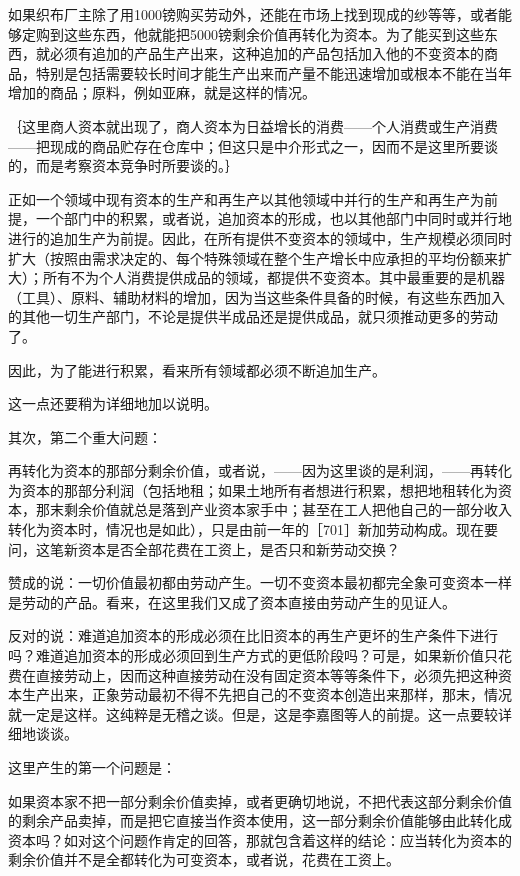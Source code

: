 如果织布厂主除了用1000镑购买劳动外，还能在市场上找到现成的纱等等，或者能够定购到这些东西，他就能把5000镑剩余价值再转化为资本。为了能买到这些东西，就必须有追加的产品生产出来，这种追加的产品包括加入他的不变资本的商品，特别是包括需要较长时间才能生产出来而产量不能迅速增加或根本不能在当年增加的商品；原料，例如亚麻，就是这样的情况。

｛这里商人资本就出现了，商人资本为日益增长的消费——个人消费或生产消费——把现成的商品贮存在仓库中；但这只是中介形式之一，因而不是这里所要谈的，而是考察资本竞争时所要谈的。｝

正如一个领域中现有资本的生产和再生产以其他领域中并行的生产和再生产为前提，一个部门中的积累，或者说，追加资本的形成，也以其他部门中同时或并行地进行的追加生产为前提。因此，在所有提供不变资本的领域中，生产规模必须同时扩大（按照由需求决定的、每个特殊领域在整个生产增长中应承担的平均份额来扩大）；所有不为个人消费提供成品的领域，都提供不变资本。其中最重要的是机器（工具）、原料、辅助材料的增加，因为当这些条件具备的时候，有这些东西加入的其他一切生产部门，不论是提供半成品还是提供成品，就只须推动更多的劳动了。

因此，为了能进行积累，看来所有领域都必须不断追加生产。

这一点还要稍为详细地加以说明。

其次，第二个重大问题：

再转化为资本的那部分剩余价值，或者说，——因为这里谈的是利润，——再转化为资本的那部分利润（包括地租；如果土地所有者想进行积累，想把地租转化为资本，那末剩余价值就总是落到产业资本家手中；甚至在工人把他自己的一部分收入转化为资本时，情况也是如此），只是由前一年的［701］新加劳动构成。现在要问，这笔新资本是否全部花费在工资上，是否只和新劳动交换？

赞成的说：一切价值最初都由劳动产生。一切不变资本最初都完全象可变资本一样是劳动的产品。看来，在这里我们又成了资本直接由劳动产生的见证人。

反对的说：难道追加资本的形成必须在比旧资本的再生产更坏的生产条件下进行吗？难道追加资本的形成必须回到生产方式的更低阶段吗？可是，如果新价值只花费在直接劳动上，因而这种直接劳动在没有固定资本等等条件下，必须先把这种资本生产出来，正象劳动最初不得不先把自己的不变资本创造出来那样，那末，情况就一定是这样。这纯粹是无稽之谈。但是，这是李嘉图等人的前提。这一点要较详细地谈谈。

这里产生的第一个问题是：

如果资本家不把一部分剩余价值卖掉，或者更确切地说，不把代表这部分剩余价值的剩余产品卖掉，而是把它直接当作资本使用，这一部分剩余价值能够由此转化成资本吗？如对这个问题作肯定的回答，那就包含着这样的结论：应当转化为资本的剩余价值并不是全都转化为可变资本，或者说，花费在工资上。


